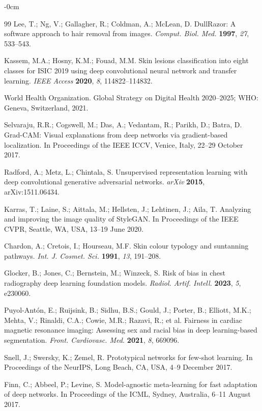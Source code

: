 \documentclass[ai,article,submit,pdftex,moreauthors]{Definitions/mdpi}
\begin{document}
\begin{adjustwidth}{-\extralength}{0cm}
\begin{thebibliography}{99}
Lee, T.; Ng, V.; Gallagher, R.; Coldman, A.; McLean, D. DullRazor: A software approach to hair removal from images. \textit{Comput. Biol. Med.} \textbf{1997}, \textit{27}, 533--543.

Kassem, M.A.; Hosny, K.M.; Fouad, M.M. Skin lesions classification into eight classes for ISIC 2019 using deep convolutional neural network and transfer learning. \textit{IEEE Access} \textbf{2020}, \textit{8}, 114822--114832.

World Health Organization. Global Strategy on Digital Health 2020--2025; WHO: Geneva, Switzerland, 2021.

Selvaraju, R.R.; Cogswell, M.; Das, A.; Vedantam, R.; Parikh, D.; Batra, D. Grad-CAM: Visual explanations from deep networks via gradient-based localization. In Proceedings of the IEEE ICCV, Venice, Italy, 22--29 October 2017.

Radford, A.; Metz, L.; Chintala, S. Unsupervised representation learning with deep convolutional generative adversarial networks. \textit{arXiv} \textbf{2015}, arXiv:1511.06434.

Karras, T.; Laine, S.; Aittala, M.; Hellsten, J.; Lehtinen, J.; Aila, T. Analyzing and improving the image quality of StyleGAN. In Proceedings of the IEEE CVPR, Seattle, WA, USA, 13--19 June 2020.

Chardon, A.; Cretois, I.; Hourseau, M.F. Skin colour typology and suntanning pathways. \textit{Int. J. Cosmet. Sci.} \textbf{1991}, \textit{13}, 191--208.

Glocker, B.; Jones, C.; Bernstein, M.; Winzeck, S. Risk of bias in chest radiography deep learning foundation models. \textit{Radiol. Artif. Intell.} \textbf{2023}, \textit{5}, e230060.

Puyol-Ant\'{o}n, E.; Ruijsink, B.; Sidhu, B.S.; Gould, J.; Porter, B.; Elliott, M.K.; Mehta, V.; Rinaldi, C.A.; Cowie, M.R.; Razavi, R.; et al. Fairness in cardiac magnetic resonance imaging: Assessing sex and racial bias in deep learning-based segmentation. \textit{Front. Cardiovasc. Med.} \textbf{2021}, \textit{8}, 669096.

Snell, J.; Swersky, K.; Zemel, R. Prototypical networks for few-shot learning. In Proceedings of the NeurIPS, Long Beach, CA, USA, 4--9 December 2017.

Finn, C.; Abbeel, P.; Levine, S. Model-agnostic meta-learning for fast adaptation of deep networks. In Proceedings of the ICML, Sydney, Australia, 6--11 August 2017.

\end{thebibliography}

\PublishersNote{}
\end{adjustwidth}
\end{document}
